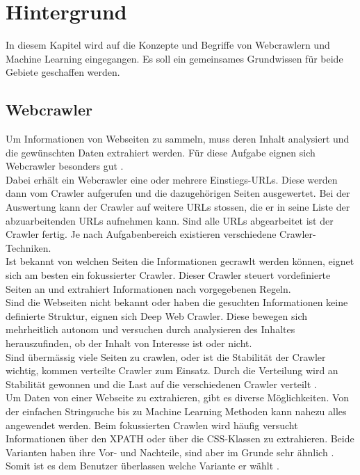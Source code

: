 \section{Hintergrund}
In diesem Kapitel wird auf die Konzepte und Begriffe von Webcrawlern und Machine Learning eingegangen. Es soll ein gemeinsames Grundwissen für beide Gebiete geschaffen werden.
%
\subsection{Webcrawler}
Um Informationen von Webseiten zu sammeln, muss deren Inhalt analysiert und die gewünschten Daten extrahiert werden. Für diese Aufgabe eignen sich Webcrawler besonders gut \cite{scrapy_1, scrapy_2}.\\
Dabei erhält ein Webcrawler eine oder mehrere Einstiegs-URLs. Diese werden dann vom Crawler aufgerufen und die dazugehörigen Seiten ausgewertet. Bei der Auswertung kann der Crawler auf weitere URLs stossen, die er in seine Liste der abzuarbeitenden URLs aufnehmen kann. Sind alle URLs abgearbeitet ist der Crawler fertig. Je nach Aufgabenbereich existieren verschiedene Crawler-Techniken.\\
Ist bekannt von welchen Seiten die Informationen gecrawlt werden können, eignet sich am besten ein fokussierter Crawler. Dieser Crawler steuert vordefinierte Seiten an und extrahiert Informationen nach vorgegebenen Regeln.\\
Sind die Webseiten nicht bekannt oder haben die gesuchten Informationen keine definierte Struktur, eignen sich Deep Web Crawler. Diese bewegen sich mehrheitlich autonom und versuchen durch analysieren des Inhaltes herauszufinden, ob der Inhalt von Interesse ist oder nicht.\\
Sind übermässig viele Seiten zu crawlen, oder ist die Stabilität der Crawler wichtig, kommen verteilte Crawler zum Einsatz. Durch die Verteilung wird an Stabilität gewonnen und die Last auf die verschiedenen Crawler verteilt \cite{scrapy_3}.\\[2ex]
%
Um Daten von einer Webseite zu extrahieren, gibt es diverse Möglichkeiten. Von der einfachen Stringsuche bis zu Machine Learning Methoden kann nahezu alles angewendet werden. Beim fokussierten Crawlen wird häufig versucht Informationen über den XPATH oder über die CSS-Klassen zu extrahieren. Beide Varianten haben ihre Vor- und Nachteile, sind aber im Grunde sehr ähnlich \cite{xpath_vs_css}. Somit ist es dem Benutzer überlassen welche Variante er wählt \cite{xpath}.\\[2ex]
